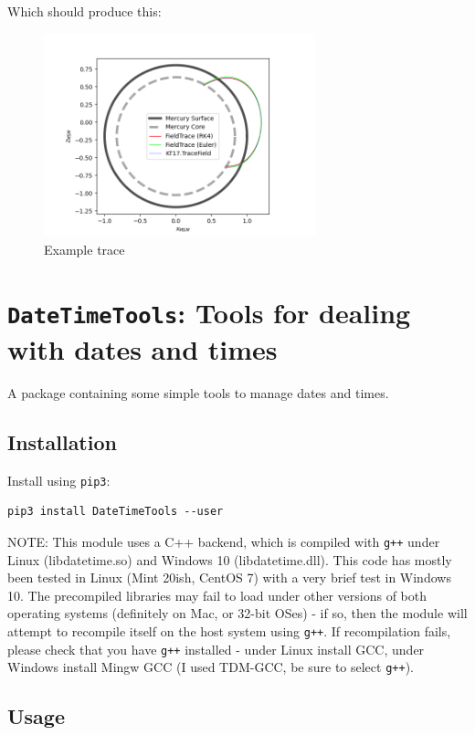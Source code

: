 	Which should produce this:
	
	\begin{figure}[H]
		\centering
		\includegraphics[width=0.7\textwidth]{figures/ch7_ftExample.png}
		\caption{Example trace}
	\end{figure}
	
	
	\section{\texttt{DateTimeTools}: Tools for dealing with dates and times}


A package containing some simple tools to manage dates and times.

\subsection{Installation}

Install using \texttt{pip3}:

\begin{verbatim}
pip3 install DateTimeTools --user
\end{verbatim}

NOTE: This module uses a C++ backend, which is compiled with \texttt{g++} under Linux (libdatetime.so) and Windows 10 (libdatetime.dll). This code has mostly been tested in Linux (Mint 20ish, CentOS 7) with a very brief test in Windows 10. The precompiled libraries may fail to load under other versions of both operating systems (definitely on Mac, or 32-bit OSes) - if so, then the module will attempt to recompile itself on the host system using \texttt{g++}. If recompilation fails, please check that you have \texttt{g++} installed - under Linux install GCC, under Windows install Mingw GCC (I used TDM-GCC, be sure to select \texttt{g++}).

\subsection{Usage}

